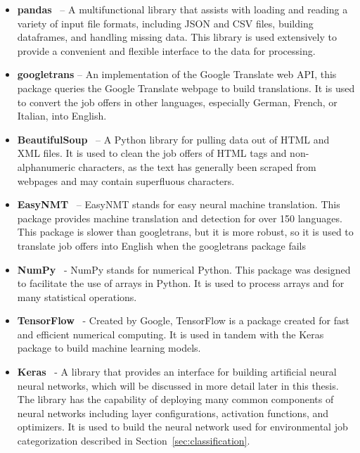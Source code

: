 \begin{itemize}
    \item \textbf{pandas}~\cite{reback2020pandas,mckinney-proc-scipy-2010} -- A multifunctional library that assists with loading and reading a variety of input file formats, including JSON and CSV files, building dataframes, and handling missing data. This library is used extensively to provide a convenient and flexible interface to the data for processing.

    \item \textbf{googletrans} -- An implementation of the Google Translate web API, this package queries the Google Translate webpage to build translations. It is used to convert the job offers in other languages, especially German, French, or Italian, into English.

    \item \textbf{BeautifulSoup}~\cite{richardson2007beautiful} -- A Python library for pulling data out of HTML and XML files. It is used to clean the job offers of HTML tags and non-alphanumeric characters, as the text has generally been scraped from webpages and may contain superfluous characters.

    \item \textbf{EasyNMT}~\cite{TiedemannThottingal:EAMT2020} -- EasyNMT stands for easy neural machine translation. This package provides machine translation and detection for over 150 languages. This package is slower than googletrans, but it is more robust, so it is used to translate job offers into English when the googletrans package fails

    \item \textbf{NumPy}~\cite{harris2020array} - NumPy stands for numerical Python. This package was designed to facilitate the use of arrays in Python. It is used to process arrays and for many statistical operations.
    
    \item \textbf{TensorFlow}~\cite{tensorflow2015-whitepaper} - Created by Google, TensorFlow is a package created for fast and efficient numerical computing. It is used in tandem with the Keras package to build machine learning models.

    \item \textbf{Keras}~\cite{chollet2015keras} - A library that provides an interface for building artificial neural neural networks, which will be discussed in more detail later in this thesis. The library has the capability of deploying many common components of neural networks including layer configurations, activation functions, and optimizers. It is used to build the neural network used for environmental job categorization described in Section~\ref{sec:classification}.
    

\end{itemize}
